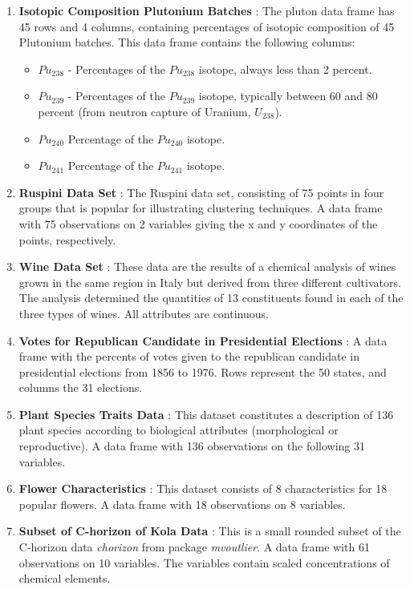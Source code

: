 \begin{enumerate}
\item \textbf{Isotopic Composition Plutonium Batches} : The pluton data frame has 45 rows and
4 columns, containing percentages of isotopic composition of 45 Plutonium batches.
This data frame contains the following columns:
\begin{itemize}
\item \textit{$Pu_{238}$} - Percentages of the \textit{$Pu_{238}$} isotope, always less than 2 percent.
\item \textit{$Pu_{239}$} - Percentages of the \textit{$Pu_{239}$} isotope, typically between 60 and 80 percent
(from neutron capture of Uranium, \textit{$U_{238}$}).
\item \textit{$Pu_{240}$} Percentage of the \textit{$Pu_{240}$} isotope.
\item \textit{$Pu_{241}$} Percentage of the \textit{$Pu_{241}$} isotope.
\end{itemize}

\item \textbf{Ruspini Data Set} : The Ruspini data set, consisting of 75 points in four groups that
is popular for illustrating clustering techniques. A data frame with 75 observations on 2 variables giving
the x and y coordinates of the points, respectively.

\item \textbf{Wine Data Set} : These data are the results of a chemical analysis of wines grown
in the same region in Italy but derived from three different cultivators. The analysis determined
the quantities of 13 constituents found in each of the three types of wines. All attributes are continuous.

\item \textbf{Votes for Republican Candidate in Presidential Elections} : A data frame with the percents
of votes given to the republican candidate in presidential elections from 1856 to 1976. Rows represent the
50 states, and columns the 31 elections.

\item \textbf{Plant Species Traits Data} : This dataset constitutes a description of 136 plant species according to biological attributes (morphological or reproductive). A data frame with 136 observations on the following 31 variables.

\item \textbf{Flower Characteristics} : This dataset consists of 8 characteristics for 18 popular flowers. A data frame with 18 observations on 8 variables.

\item \textbf{Subset of C-horizon of Kola Data} : This is a small rounded subset of the C-horizon data \textit{chorizon} from package \textit{mvoutlier}. A data frame with 61 observations on 10 variables. The variables contain scaled concentrations of chemical elements.

\end{enumerate}


